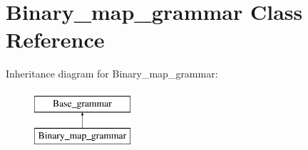\hypertarget{classBinary__map__grammar}{}\section{Binary\+\_\+map\+\_\+grammar Class Reference}
\label{classBinary__map__grammar}
Inheritance diagram for Binary\+\_\+map\+\_\+grammar\+:\begin{figure}[H]
\begin{center}
\leavevmode
\includegraphics[height=2.000000cm]{d8/d78/classBinary__map__grammar}
\end{center}
\end{figure}
